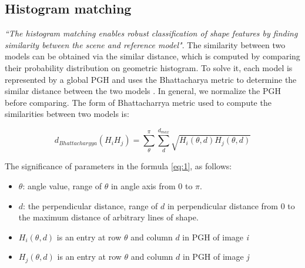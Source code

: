 \subsection{Histogram matching}
\textit{``The histogram matching enables robust classification of shape features by finding similarity between the scene and reference model"}\cite{palaniswamy2010automatic}. The similarity between two models can be obtained via the similar distance, which is computed by comparing their probability distribution on geometric histogram. To solve it, each model is represented by a global PGH and uses the Bhattacharya\cite{thacker1995assessing} metric to determine the similar distance between the two models \cite{palaniswamy2010automatic}. In general, we normalize the PGH before comparing. The form of Bhattacharrya metric used to compute the similarities between two models is:
\begin{center}
\begin{equation} \label{eq:1}
d_{Bhattacharyya} (H_{i}H_{j}) = \sum\limits_{\theta}^{\pi}\sum\limits_{d}^{d_{max}}\sqrt{H_{i}(\theta,d)H_{j}(\theta,d)}
\end{equation}
\end{center}
The significance of parameters in the formula \ref{eq:1}, as follows:
\begin{itemize}
\item $\theta$: angle value, range of $\theta$ in angle axis from 0 to $\pi$.
\item $d$: the perpendicular distance, range of $d$ in perpendicular distance from 0 to the maximum distance of arbitrary lines of shape.
\item $H_{i}(\theta,d)$ is an entry at row $\theta$ and column $d$ in PGH of image \textit{i}
\item $H_{j}(\theta,d)$ is an entry at row $\theta$ and column $d$ in PGH of image \textit{j}
\end{itemize}
